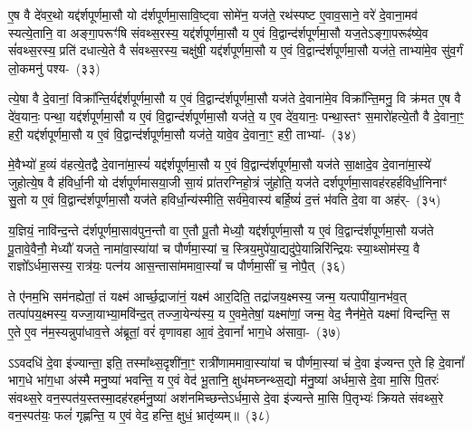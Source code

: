 {\anuvakamend[{च॒न्द्रमा॒ द्वे दे॑वलो॒कमे॒व यद्य॒ज्ञं प॑ल्पूलयेयुः॒ षट्च॑}]}

ए॒ष वै दे॑वर॒थो यद्द॑र्\mbox{}श\-पूर्ण\-मा॒सौ यो द॑र्\mbox{}शपूर्णमा॒सावि॒ष्ट्वा सोमे॑न॒ यज॑ते॒ रथ॑स्पष्ट ए॒वाव॒साने॒ वरे॑ दे॒वाना॒मव॑ स्यत्ये॒तानि॒ वा अङ्गा॒परूꣳ॑षि संवथ्स॒रस्य॒ यद्द॑र्\mbox{}श\-पूर्ण\-मा॒सौ य ए॒वं वि॒द्वान्द॑र्\mbox{}शपूर्णमा॒सौ यज॒ते\-ऽङ्गा॒परूꣴ॑ष्ये॒व सं॑वथ्स॒रस्य॒ प्रति॑ दधात्ये॒ते वै सं॑वथ्स॒रस्य॒ चक्षु॑षी॒ यद्द॑र्\mbox{}श\-पूर्ण\-मा॒सौ य ए॒वं वि॒द्वान्द॑र्\mbox{}शपूर्णमा॒सौ यज॑ते॒ ताभ्या॑मे॒व सु॑व॒र्गं लो॒कमनु॑ \mbox{पश्य-~(३३)\ip}

त्ये॒षा वै दे॒वानां॒ विक्रा᳚न्ति॒र्यद्द॑र्\mbox{}श\-पूर्ण\-मा॒सौ य ए॒वं वि॒द्वान्द॑र्\mbox{}शपूर्णमा॒सौ यज॑ते दे॒वाना॑मे॒व विक्रा᳚न्ति॒मनु॒ वि क्र॑मत ए॒ष वै दे॑व॒यानः॒ पन्था॒ यद्द॑र्\mbox{}श\-पूर्ण\-मा॒सौ य ए॒वं वि॒द्वान्द॑र्\mbox{}शपूर्णमा॒सौ यज॑ते॒ य ए॒व दे॑व॒यानः॒ पन्था॒स्तꣳ स॒मारो॑हत्ये॒तौ वै दे॒वाना॒ꣳ॒ हरी॒ यद्द॑र्\mbox{}श\-पूर्ण\-मा॒सौ य ए॒वं वि॒द्वान्द॑र्\mbox{}शपूर्णमा॒सौ यज॑ते॒ यावे॒व दे॒वाना॒ꣳ॒ हरी॒ ताभ्या॑-~(३४)\ip

मे॒वैभ्यो॑ ह॒व्यं व॑हत्ये॒तद्वै दे॒वाना॑मा॒स्यं॑ यद्द॑र्\mbox{}श\-पूर्ण\-मा॒सौ य ए॒वं वि॒द्वान्द॑र्\mbox{}शपूर्णमा॒सौ यज॑ते सा॒क्षादे॒व दे॒वाना॑मा॒स्ये॑ जुहोत्ये॒ष वै ह॑विर्धा॒नी यो द॑र्\mbox{}शपूर्णमासया॒जी सा॒यं प्रा॑तरग्निहो॒त्रं जु॑होति॒ यज॑ते दर्\mbox{}श\-पूर्ण\-मा॒सावह॑रहर्\mbox{}हविर्धा॒निनाꣳ॑ सु॒तो य ए॒वं वि॒द्वान्द॑र्\mbox{}शपूर्णमा॒सौ यज॑ते हविर्धा॒न्य॑स्मीति॒ सर्व॑मे॒वास्य॑ बर्\mbox{}हि॒ष्यं॑ द॒त्तं भ॑वति दे॒वा वा अह॑र्-~(३५)\ip

य॒ज्ञियं॒ नावि॑न्द॒न्ते द॑र्\mbox{}शपूर्णमा॒साव॑पुन॒न्तौ वा ए॒तौ पू॒तौ मेध्यौ॒ यद्द॑र्\mbox{}श\-पूर्ण\-मा॒सौ य ए॒वं वि॒द्वान्द॑र्\mbox{}शपूर्णमा॒सौ यज॑ते पू॒तावे॒वैनौ॒ मेध्यौ॑ यजते॒ नामा॑वा॒स्या॑यां च पौर्णमा॒स्यां च॒ स्त्रिय॒मुपे॑या॒द्यदु॑पे॒यान्निरि॑न्द्रियः स्या॒थ्सोम॑स्य॒ वै राज्ञो᳚\-ऽर्धमा॒सस्य॒ रात्र॑यः॒ पत्न॑य आस॒न्तासा॑ममावा॒स्यां᳚ च पौर्णमा॒सीं च॒ नोपै॒त्~(३६)\ip

ते ए॑नम॒भि सम॑नह्येतां॒ तं यक्ष्म॑ आर्च्छ॒द्राजा॑नं॒ यक्ष्म॑ आर॒दिति॒ तद्रा॑जय॒क्ष्मस्य॒ जन्म॒ यत्पापी॑या॒नभ॑व॒त् त\-त्पा॑पय॒क्ष्मस्य॒ यज्जा॒याभ्या॒मवि॑न्द॒त् तज्जा॒येन्य॑स्य॒ य ए॒वमे॒तेषां॒ यक्ष्मा॑णां॒ जन्म॒ वेद॒ नैन॑मे॒ते यक्ष्मा॑ विन्दन्ति॒ स ए॒ते ए॒व न॑म॒स्यन्नुपा॑धाव॒त्ते अ॑ब्रूतां॒ वरं॑ वृणावहा आ॒वं दे॒वानां᳚ भाग॒\-धे अ॑सावा॒-~(३७)\ip

ऽऽवदधि॑ दे॒वा इ॑ज्यान्ता॒ इति॒ तस्मा᳚थ्स॒दृशी॑ना॒ꣳ॒ रात्री॑णाममावा॒स्या॑यां च पौर्णमा॒स्यां च॑ दे॒वा इ॑ज्यन्त ए॒ते हि दे॒वानां᳚ भाग॒\-धे भा॑ग॒धा अ॑स्मै मनु॒ष्या॑ भवन्ति॒ य ए॒वं वेद॑ भू॒तानि॒ क्षुध॑मघ्नन्थ्स॒द्यो म॑नु॒ष्या॑ अर्धमा॒से दे॒वा मा॒सि पि॒तरः॑ संवथ्स॒रे वन॒स्पत॑य॒स्तस्मा॒दह॑रहर्मनु॒ष्या॑ अश॑नमिच्छन्ते\-ऽर्धमा॒से दे॒वा इ॑ज्यन्ते मा॒सि पि॒तृभ्यः॑ क्रियते संवथ्स॒रे वन॒स्पत॑यः॒ फलं॑ गृह्णन्ति॒ य ए॒वं वेद॒ हन्ति॒ क्षुधं॒ भ्रातृ॑व्यम्॥~(३८)\ip

